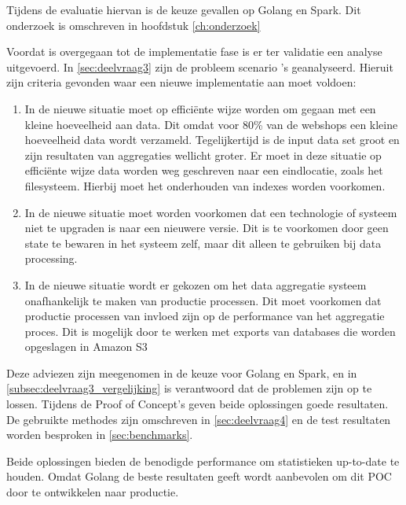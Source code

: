 \clearpage

Tijdens de evaluatie hiervan is de keuze gevallen op Golang en Spark. Dit onderzoek is omschreven in hoofdstuk \ref{ch:onderzoek}

Voordat is overgegaan tot de implementatie fase is er ter validatie een analyse uitgevoerd. In \ref{sec:deelvraag3} zijn de probleem scenario 's geanalyseerd. Hieruit zijn criteria gevonden waar een nieuwe implementatie aan moet voldoen:

\begin{enumerate}[label=(\alph*)]
    \item In de nieuwe situatie moet op efficiënte wijze worden om gegaan met een kleine hoeveelheid aan data. Dit omdat voor 80\% van de webshops een kleine hoeveelheid data wordt verzameld. Tegelijkertijd is de input data set groot en zijn resultaten van aggregaties wellicht groter. Er moet in deze situatie op efficiënte wijze data worden weg geschreven naar een eindlocatie,  zoals het filesysteem. Hierbij moet het onderhouden van indexes worden voorkomen.
    
    \item In de nieuwe situatie moet worden voorkomen dat een technologie of systeem niet te upgraden is naar een nieuwere versie. Dit is te voorkomen door geen state te bewaren in het systeem zelf, maar dit alleen te gebruiken bij data processing.
    
    \item In de nieuwe situatie wordt er gekozen om het data aggregatie systeem onafhankelijk te maken van productie processen. Dit moet voorkomen dat productie processen van invloed zijn op de performance van het aggregatie proces. Dit is mogelijk door te werken met exports van databases die worden opgeslagen in Amazon S3
\end{enumerate}

Deze adviezen zijn meegenomen in de keuze voor Golang en Spark, en in \ref{subsec:deelvraag3_vergelijking} is verantwoord dat de problemen zijn op te lossen. Tijdens de Proof of Concept's geven beide oplossingen goede resultaten. De gebruikte methodes zijn omschreven in \ref{sec:deelvraag4} en de test resultaten worden besproken in \ref{sec:benchmarks}.

Beide oplossingen bieden de benodigde performance om statistieken up-to-date te houden. Omdat Golang de beste resultaten geeft wordt aanbevolen om dit POC door te ontwikkelen naar productie.